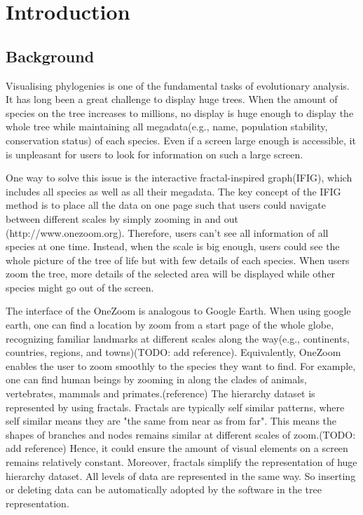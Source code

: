 \documentclass[MSc]{icldt}
\begin{document}
\tableofcontents
\listoftables
\listoffigures

\chapter{Introduction}

\section{Background}

Visualising phylogenies is one of the fundamental tasks of evolutionary analysis. It has long been a great challenge to display huge trees. When the amount of species on the tree increases to millions, no display is huge enough to display the whole tree while maintaining all megadata(e.g., name, population stability, conservation status) of each species. Even if a screen large enough is accessible, it is unpleasant for users to look for information on such a large screen. 

One way to solve this issue is the interactive fractal-inspired graph(IFIG), which includes all species as well as all their megadata. The key concept of the IFIG method is to place all the data on one page such that users could navigate between different scales by simply zooming in and out (http://www.onezoom.org). Therefore, users can't see all information of all species at one time. Instead, when the scale is big enough, users could see the whole picture of the tree of life but with few details of each species. When users zoom the tree, more details of the selected area will be displayed while other species might go out of the screen.

The interface of the OneZoom is analogous to Google Earth. When using google earth, one can find a location by zoom from a start page of the whole globe, recognizing familiar landmarks at different scales along the way(e.g., continents, countries, regions, and towns)(TODO: add reference). Equivalently, OneZoom enables the user to zoom smoothly to the species they want to find. For example, one can find human beings by zooming in along the clades of animals, vertebrates, mammals and primates.(reference) The hierarchy dataset is represented by using fractals. Fractals are typically self similar patterns, where self similar means they are "the same from near as from far". This means the shapes of branches and nodes remains similar at different scales of zoom.(TODO: add reference) Hence, it could ensure the amount of visual elements on a screen remains relatively constant. Moreover, fractals simplify the representation of huge hierarchy dataset. All levels of data are represented in the same way. So inserting or deleting data can be automatically adopted by the software in the tree representation.
\end{document}
